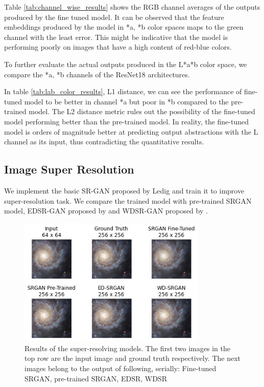 \documentclass[oneside,a4paper,12pt]{report}
\begin{document}


Table \ref{tab:channel_wise_results} shows the RGB channel averages of the outputs produced by the fine tuned model. It can be observed that the feature embeddings produced by the model in *a, *b color spaces maps to the green channel with the least error. This might be indicative that the model is performing poorly on images that have a high content of red-blue colors. 

To further evaluate the actual outputs produced in the L*a*b color space, we compare the *a, *b channels of the ResNet18 architectures. 

 
In table \ref{tab:lab_color_results}, L1 distance, we can see the performance of fine-tuned model to be better in channel *a but poor in *b compared to the pre-trained model. The L2 distance metric rules out the possibility of the fine-tuned model performing better than the pre-trained model. In reality, the fine-tuned model is orders of magnitude better at predicting output abstractions with the L channel as its input, thus contradicting the quantitative results.

\subsection{Image Super Resolution}
\hspace*{0.25 in}We implement the basic SR-GAN proposed by Ledig and train it to improve super-resolution task. We compare the trained model with pre-trained SRGAN model, EDSR-GAN proposed by \cite{lim2017enhanced} and WDSR-GAN proposed by \cite{yu2018wide}.

\begin{figure}[!htb]
	\includegraphics[width=0.8\textwidth]{figures/comparison_upscale}
	\caption{Results of the super-resolving models. The first two images in the top row are the input image and ground truth respectively. The next images belong to the output of following, serially: Fine-tuned SRGAN, pre-trained SRGAN, EDSR, WDSR}
	\label{fig: sr_results}
\end{figure}
\end{document}
